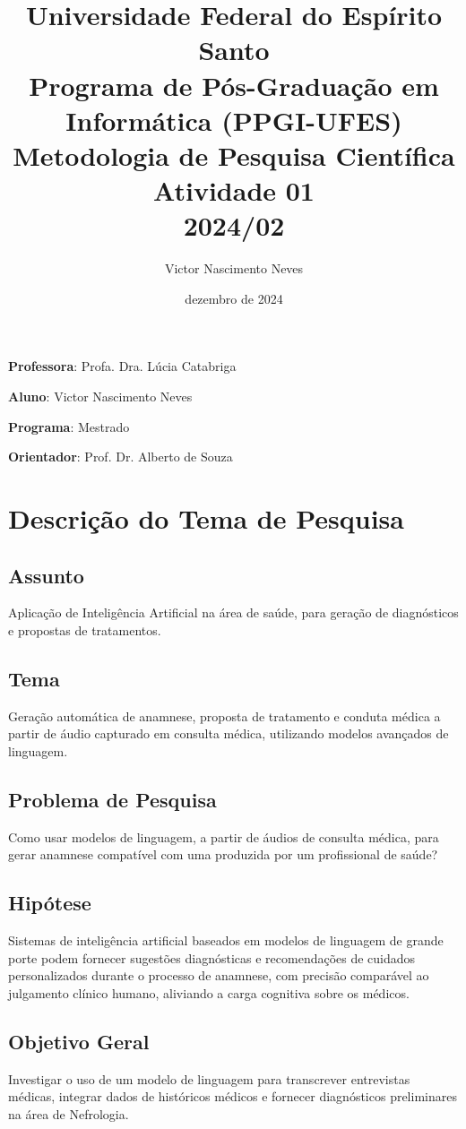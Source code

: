 \documentclass[
	article,
	11pt,
	oneside,
	a4paper,
	english,
	brazil,
	sumario=tradicional
	]{abntex2}
\title{
\textbf{Universidade Federal do Espírito Santo}\\
\textbf{Programa de Pós-Graduação em Informática (PPGI-UFES)}\\[10pt]
Metodologia de Pesquisa Científica\\
Atividade 01 \\[5pt]
2024/02
}
\author{Victor Nascimento Neves}
\date{dezembro de 2024}
\begin{document}
\maketitle

\textbf{Professora}: Profa. Dra. Lúcia Catabriga

\textbf{Aluno}: Victor Nascimento Neves

\textbf{Programa}: Mestrado

\textbf{Orientador}: Prof. Dr. Alberto de Souza



\section{Descrição do Tema de Pesquisa}
\subsection{Assunto}
Aplicação de Inteligência Artificial na área de saúde, para geração de diagnósticos e propostas de tratamentos.

\subsection{Tema}
Geração automática de anamnese, proposta de tratamento e conduta médica a partir de áudio capturado em consulta médica, utilizando modelos avançados de linguagem.

\subsection{Problema de Pesquisa}
Como usar modelos de linguagem, a partir de áudios de consulta médica, para gerar anamnese compatível com uma produzida por um profissional de saúde?

\subsection{Hipótese}
Sistemas de inteligência artificial baseados em modelos de linguagem de grande porte podem fornecer sugestões diagnósticas e recomendações de cuidados personalizados durante o processo de anamnese, com precisão comparável ao julgamento clínico humano, aliviando a carga cognitiva sobre os médicos.

\subsection{Objetivo Geral}
Investigar o uso de um modelo de linguagem para transcrever entrevistas médicas, integrar dados de históricos médicos e fornecer diagnósticos preliminares na área de Nefrologia.
\end{document}
